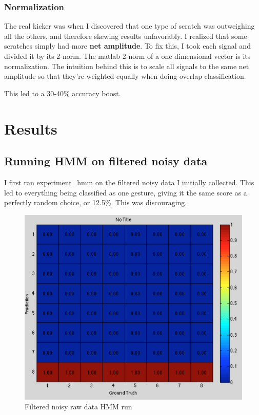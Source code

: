 \documentclass[12pt]{article}
\begin{document}
\subsubsection{Normalization}

The real kicker was when I discovered that one type of scratch was outweighing all the others, and therefore skewing results unfavorably. I realized that some scratches simply had more {\bf net amplitude}. To fix this, I took each signal and divided it by its 2-norm. The matlab 2-norm of a one dimensional vector is its normalization. The intuition behind this is to scale all signals to the same net amplitude so that they're weighted equally when doing overlap classification.

This led to a 30-40\% accuracy boost.

\section{Results}

\subsection{Running HMM on filtered noisy data}
I first ran experiment\_hmm on the filtered noisy data I initially collected. This led to everything being classified as one gesture, giving it the same score as a perfectly random choice, or 12.5\%. This was discouraging.

\begin{figure}[h!]
\centering
\includegraphics[scale=0.6]{raw.png}
\caption{Filtered noisy raw data HMM run}
\end{figure}
\end{document}
